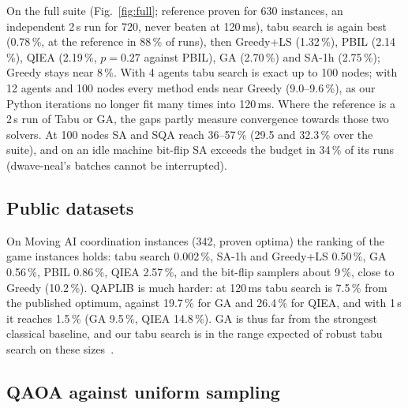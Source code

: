 \documentclass[sigconf]{acmart}
\begin{document}
On the full suite (Fig.~\ref{fig:full}; reference proven for 630 instances, an independent 2\,s
run for 720, never beaten at 120\,ms), tabu search is again best (0.78\,\%, at the reference in
88\,\% of runs), then Greedy+LS (1.32\,\%), PBIL (2.14\,\%), QIEA (2.19\,\%, $p=0.27$ against PBIL),
GA (2.70\,\%) and SA-1h (2.75\,\%); Greedy stays near 8\,\%. With 4 agents tabu search is exact up to
100 nodes; with 12 agents and 100 nodes every method ends near Greedy (9.0--9.6\,\%), as our Python
iterations no longer fit many times into 120\,ms. Where the reference is a 2\,s run of Tabu or GA,
the gaps partly measure convergence towards those two solvers. At 100 nodes SA and SQA reach
36--57\,\% (29.5 and 32.3\,\% over the suite), and on an idle
machine bit-flip SA exceeds the budget in 34\,\% of its runs (dwave-neal's batches cannot be
interrupted).

\subsection{Public datasets}

On Moving AI coordination instances (342, proven optima) the ranking of the game
instances holds: tabu search 0.002\,\%, SA-1h and Greedy+LS 0.50\,\%, GA 0.56\,\%, PBIL 0.86\,\%,
QIEA 2.57\,\%, and the bit-flip samplers about 9\,\%, close to Greedy (10.2\,\%). QAPLIB is much harder:
at 120\,ms tabu search is 7.5\,\% from the published optimum, against 19.7\,\% for GA and 26.4\,\% for
QIEA, and with 1\,s it reaches 1.5\,\% (GA 9.5\,\%, QIEA 14.8\,\%). GA is thus far from the strongest classical
baseline, and our tabu search is in the range expected of robust tabu search on these
sizes~\cite{Taillard1991}.

\subsection{QAOA against uniform sampling}\label{sec:qaoa}

\begin{table}[t]
\centering\small
\caption{QAOA read from the statevector ($p=3$, angles optimized without a time limit),
means over instances. $P_\text{valid}$, $P_\text{opt}$: probability of measuring a valid assignment,
an optimal one. Ratio: median of $P_\text{opt}$ over that of sampling valid assignments uniformly.
hit$_{512}$, unif.: probability that 512 shots contain the optimum, for QAOA and for 512 uniformly
drawn valid assignments. X: standard mixer; XY: ring-XY mixer in the one-hot sector.}
\label{tab:qaoa}
\setlength{\tabcolsep}{3pt}

\end{table}
\end{document}
